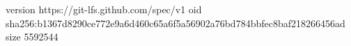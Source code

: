 version https://git-lfs.github.com/spec/v1
oid sha256:b1367d8290ce772e9a6d460c65a6f5a56902a76bd784bbfec8baf218266456ad
size 5592544
